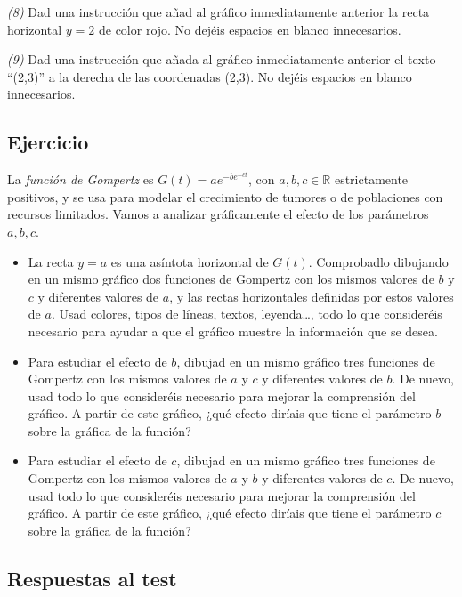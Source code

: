 \documentclass[
]{book}
\providecommand{\tightlist}{%
  \setlength{\itemsep}{0pt}\setlength{\parskip}{0pt}}
\theoremstyle{definition}
\theoremstyle{definition}
\theoremstyle{definition}
\theoremstyle{remark}
\begin{document}
\emph{(8)} Dad una instrucción que añad al gráfico inmediatamente anterior la recta horizontal \(y=2\) de color rojo. No dejéis espacios en blanco innecesarios.

\emph{(9)} Dad una instrucción que añada al gráfico inmediatamente anterior el texto ``(2,3)'' a la derecha de las coordenadas (2,3). No dejéis espacios en blanco innecesarios.

\hypertarget{ejercicio-5}{%
\subsection*{Ejercicio}\label{ejercicio-5}}

La \emph{función de Gompertz} es \(G(t)=ae^{-be^{-ct}}\), con \(a, b, c\in \mathbb{R}\) estrictamente positivos, y se usa para modelar
el crecimiento de tumores o de poblaciones con recursos limitados. Vamos a analizar gráficamente el efecto de los parámetros \(a, b, c\).

\begin{itemize}
\tightlist
\item
  La recta \(y=a\) es una asíntota horizontal de \(G(t)\). Comprobadlo dibujando en un mismo gráfico dos funciones de Gompertz con los mismos valores de \(b\) y \(c\) y diferentes valores de \(a\), y las rectas horizontales definidas por estos valores de \(a\). Usad colores, tipos de líneas, textos, leyenda\ldots, todo lo que consideréis necesario para ayudar a que el gráfico muestre la información que se desea.
\item
  Para estudiar el efecto de \(b\), dibujad en un mismo gráfico tres funciones de Gompertz con los mismos valores de \(a\) y \(c\) y diferentes valores de \(b\). De nuevo, usad todo lo que consideréis necesario para mejorar la comprensión del gráfico.
  A partir de este gráfico, ¿qué efecto diríais que tiene el parámetro \(b\) sobre la gráfica de la función?
\item
  Para estudiar el efecto de \(c\), dibujad en un mismo gráfico tres funciones de Gompertz con los mismos valores de \(a\) y \(b\) y diferentes valores de \(c\). De nuevo, usad todo lo que consideréis necesario para mejorar la comprensión del gráfico. A partir de este gráfico, ¿qué efecto diríais que tiene el parámetro \(c\) sobre la gráfica de la función?
\end{itemize}

\hypertarget{respuestas-al-test-4}{%
\subsection*{Respuestas al test}\label{respuestas-al-test-4}}
\end{document}

